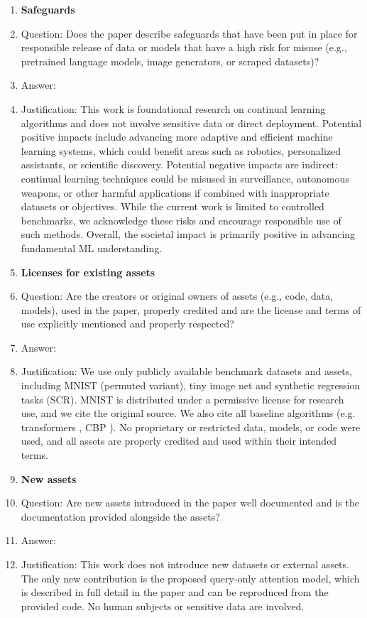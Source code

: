 \documentclass{article}
\begin{document}
\begin{enumerate}
    
\item {\bf Safeguards}
    \item[] Question: Does the paper describe safeguards that have been put in place for responsible release of data or models that have a high risk for misuse (e.g., pretrained language models, image generators, or scraped datasets)?
    \item[] Answer: \answerYes{} %
    \item[] Justification: This work is foundational research on continual learning algorithms and does not involve sensitive data or direct deployment. 
    Potential positive impacts include advancing more adaptive and efficient machine learning systems, which could benefit areas such as robotics, personalized assistants, or scientific discovery. 
    Potential negative impacts are indirect: continual learning techniques could be misused in surveillance, autonomous weapons, or other harmful applications if combined with inappropriate datasets or objectives. 
    While the current work is limited to controlled benchmarks, we acknowledge these risks and encourage responsible use of such methods. 
    Overall, the societal impact is primarily positive in advancing fundamental ML understanding.


\item {\bf Licenses for existing assets}
    \item[] Question: Are the creators or original owners of assets (e.g., code, data, models), used in the paper, properly credited and are the license and terms of use explicitly mentioned and properly respected?
    \item[] Answer: \answerYes{}   %
    \item[] Justification: We use only publicly available benchmark datasets and assets, including MNIST \citep{lecun1998gradient} (permuted variant), tiny image net and synthetic regression tasks (SCR). 
    MNIST is distributed under a permissive license for research use, and we cite the original source.  
    We also cite all baseline algorithms (e.g. transformers \citep{vaswani2017attention}, CBP \citep{dohare2024loss}).  
    No proprietary or restricted data, models, or code were used, and all assets are properly credited and used within their intended terms.  

\item {\bf New assets}
    \item[] Question: Are new assets introduced in the paper well documented and is the documentation provided alongside the assets?
    \item[] Answer: \answerNA{}   %
    \item[] Justification: This work does not introduce new datasets or external assets. 
    The only new contribution is the proposed query-only attention model, which is described in full detail in the paper and can be reproduced from the provided code. 
    No human subjects or sensitive data are involved. 



\end{enumerate}
\end{document}
